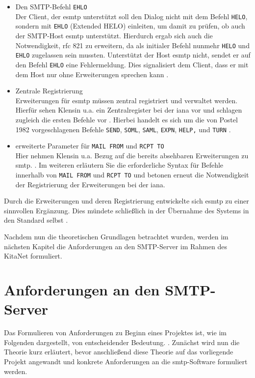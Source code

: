 \begin{itemize}
	\item{Den SMTP-Befehl \verb+EHLO+}\\
	Der Client, der \ac{esmtp} unterstützt soll den Dialog nicht mit dem Befehl \verb+HELO+, sondern mit \verb+EHLO+ (Extended HELO) einleiten, um damit zu prüfen, ob auch der SMTP-Host \ac{esmtp} unterstützt. Hierdurch ergab sich auch die Notwendigkeit, \ac{rfc} 821 zu erweitern, da als initialer Befehl nunmehr \verb+HELO+ und \verb+EHLO+ zugelassen sein mussten. Unterstützt der Host \ac{esmtp} nicht, sendet er auf den Befehl \verb+EHLO+ eine Fehlermeldung. Dies signalisiert dem Client, dass er mit dem Host nur ohne Erweiterungen sprechen kann \citep[vgl.][S. 3 ff.]{rfc1869}.
	\item{Zentrale Registrierung}\\
	Erweiterungen für \ac{esmtp} müssen zentral registriert und verwaltet werden. Hierfür sehen Klensin u.a. ein Zentralregister bei der \ac{iana} vor und schlagen zugleich die ersten Befehle vor \citep[vgl.][7]{rfc1869}. Hierbei handelt es sich um die von Postel 1982 vorgeschlagenen Befehle \verb+SEND+, \verb+SOML+, \verb+SAML+, \verb+EXPN+, \verb+HELP,+ und \verb+TURN+ \citep[für die Befehle vgl.][S. 23 ff.]{rfc821}.
	\item{erweiterte Parameter für \verb+MAIL FROM+ und \verb+RCPT TO+}\\
	Hier nehmen Klensin u.a. Bezug auf die bereits absehbaren Erweiterungen zu \ac{smtp}.  \citep[][7]{rfc1869}. Im weiteren erläutern Sie die erforderliche Syntax für Befehle innerhalb von \verb+MAIL FROM+ und \verb+RCPT TO+ und betonen erneut die Notwendigkeit der Registrierung der Erweiterungen bei der \ac{iana}.
\end{itemize}

Durch die Erweiterungen und deren Registrierung entwickelte sich \ac{esmtp} zu einer sinnvollen Ergänzung. Dies mündete schließlich in der Übernahme des Systems in den Standard selbst \citep[vgl. u.a.][S. 7 ff]{rfc2821}.

Nachdem nun die theoretischen Grundlagen betrachtet wurden, werden im nächsten Kapitel die Anforderungen an den SMTP-Server im Rahmen des KitaNet formuliert. 





\chapter{Anforderungen an den SMTP-Server}
\label{sec:Anforderung}
Das Formulieren von Anforderungen zu Beginn eines Projektes ist, wie im Folgenden dargestellt, von entscheidender Bedeutung.  \citep[][77]{Hull2010}. Zunächst wird nun die Theorie kurz erläutert, bevor anschließend diese Theorie auf das vorliegende Projekt angewandt und konkrete Anforderungen an die \ac{smtp}-Software formuliert werden.

